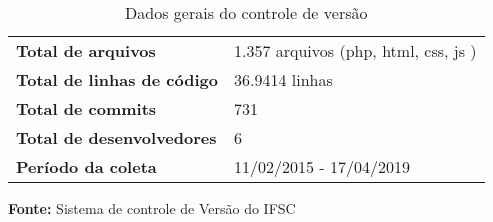 \begin{table}
\caption{Dados gerais do controle de versão}
\label{quadro_git_ingresso}
\centering
\begin{tabular}{ l l }
   \cline{1-1}\cline{2-2}  
    \multicolumn{1}{|p{5.850cm}|}{\textbf{Total de arquivos}} &
    \multicolumn{1}{p{8.217cm}|}{1.357 arquivos (php, html, css, js )}
  \\ 
   \cline{1-1}\cline{2-2}  
    \multicolumn{1}{|p{5.850cm}|}{\textbf{Total de linhas de código}} &
    \multicolumn{1}{p{8.217cm}|}{36.9414 linhas}
  \\    
   \cline{1-1}\cline{2-2}  
    \multicolumn{1}{|p{5.850cm}|}{\textbf{Total de commits}} &
    \multicolumn{1}{p{8.217cm}|}{731}
  \\    
   \cline{1-1}\cline{2-2}  
    \multicolumn{1}{|p{5.850cm}|}{\textbf{Total de desenvolvedores}} &
    \multicolumn{1}{p{8.217cm}|}{6}
  \\     
   \cline{1-1}\cline{2-2}  
    \multicolumn{1}{|p{5.850cm}|}{\textbf{Período da coleta}} &
    \multicolumn{1}{p{8.217cm}|}{11/02/2015 - 17/04/2019}
  \\       
  \hline

 \end{tabular} 
 \par\medskip\textbf{Fonte:} Sistema de controle de Versão do IFSC \par\medskip
\end{table}